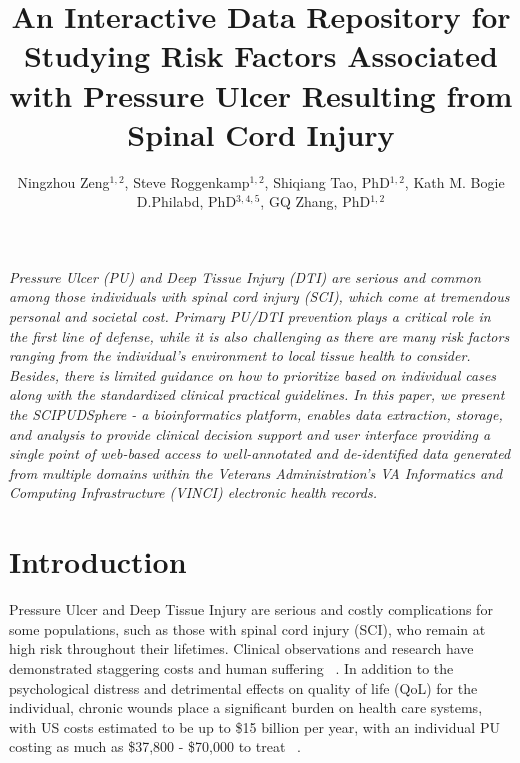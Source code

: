 \documentclass{amia}
\begin{document}
\title{An Interactive Data Repository for Studying Risk Factors Associated with Pressure Ulcer Resulting from Spinal Cord Injury}

\author{Ningzhou Zeng$^{1,2}$, Steve Roggenkamp$^{1,2}$, Shiqiang Tao, PhD$^{1,2}$, Kath M. Bogie D.Philabd, PhD$^{3,4,5}$, GQ Zhang, PhD$^{1,2}$}


\maketitle


\textit{Pressure Ulcer (PU) and Deep Tissue Injury (DTI) are serious and common among those individuals with spinal cord injury (SCI), which come at tremendous personal and societal cost. Primary PU/DTI prevention plays a critical role in the first line of defense, while it is also challenging as there are many risk factors ranging from the individual’s environment to local tissue health to consider. Besides, there is limited guidance on how to prioritize based on individual cases along with the standardized clinical practical guidelines. In this paper, we present the SCIPUDSphere - a bioinformatics platform, enables data extraction, storage, and analysis to provide clinical decision support and user interface providing a single point of web-based access to well-annotated and de-identified data generated from multiple domains within the Veterans Administration's VA Informatics and Computing Infrastructure (VINCI) electronic health records.}

\section{Introduction}
Pressure Ulcer and Deep Tissue Injury are serious and costly complications for some populations, such as those with spinal cord injury (SCI), who remain at high risk throughout their lifetimes. Clinical observations and research have demonstrated staggering costs and human suffering ~\cite{ref1,ref2,ref3}. In addition to the psychological distress and detrimental effects on quality of life (QoL) for the individual, chronic wounds place a significant burden on health care systems, with US costs estimated to be up to \$15 billion per year, with an individual PU costing as much as \$37,800 - \$70,000 to treat  ~\cite{ref4,ref5,ref6}.
\end{document}
